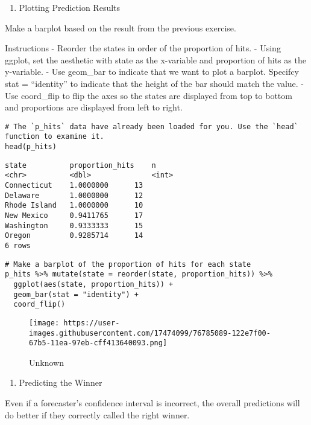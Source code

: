 \documentclass[
]{article}
\providecommand{\tightlist}{%
  \setlength{\itemsep}{0pt}\setlength{\parskip}{0pt}}
\begin{document}
\begin{enumerate}
\def\labelenumi{\arabic{enumi}.}
\setcounter{enumi}{4}
\tightlist
\item
  Plotting Prediction Results
\end{enumerate}

Make a barplot based on the result from the previous exercise.

Instructions - Reorder the states in order of the proportion of hits. -
Using ggplot, set the aesthetic with state as the x-variable and
proportion of hits as the y-variable. - Use geom\_bar to indicate that
we want to plot a barplot. Specifcy stat = ``identity'' to indicate that
the height of the bar should match the value. - Use coord\_flip to flip
the axes so the states are displayed from top to bottom and proportions
are displayed from left to right.

\begin{verbatim}
# The `p_hits` data have already been loaded for you. Use the `head` function to examine it.
head(p_hits)
\end{verbatim}

\begin{verbatim}
state          proportion_hits    n
<chr>          <dbl>              <int>
Connecticut    1.0000000      13
Delaware       1.0000000      12
Rhode Island   1.0000000      10
New Mexico     0.9411765      17
Washington     0.9333333      15
Oregon         0.9285714      14
6 rows
\end{verbatim}

\begin{verbatim}
# Make a barplot of the proportion of hits for each state
p_hits %>% mutate(state = reorder(state, proportion_hits)) %>%
  ggplot(aes(state, proportion_hits)) + 
  geom_bar(stat = "identity") +
  coord_flip()
\end{verbatim}

\begin{figure}
\centering
\texttt{[image: https://user-images.githubusercontent.com/17474099/76785089-122e7f00-67b5-11ea-97eb-cff413640093.png]}
\caption{Unknown}
\end{figure}

\begin{enumerate}
\def\labelenumi{\arabic{enumi}.}
\setcounter{enumi}{5}
\tightlist
\item
  Predicting the Winner
\end{enumerate}

Even if a forecaster's confidence interval is incorrect, the overall
predictions will do better if they correctly called the right winner.
\end{document}
